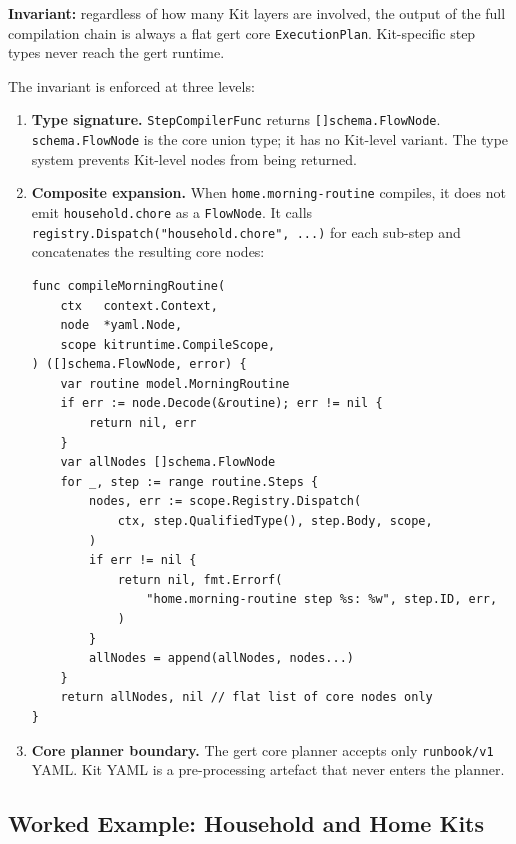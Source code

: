 \textbf{Invariant:} regardless of how many Kit layers are involved, the output
of the full compilation chain is always a flat gert core
\texttt{ExecutionPlan}.  Kit-specific step types never reach the gert runtime.

The invariant is enforced at three levels:

\begin{enumerate}
  \item \textbf{Type signature.}  \texttt{StepCompilerFunc} returns
    \texttt{[]schema.FlowNode}.  \texttt{schema.FlowNode} is the core union
    type; it has no Kit-level variant.  The type system prevents Kit-level
    nodes from being returned.

  \item \textbf{Composite expansion.}  When \texttt{home.morning-routine}
    compiles, it does not emit \texttt{household.chore} as a
    \texttt{FlowNode}.  It calls
    \texttt{registry.Dispatch("household.chore",~...)} for each sub-step and
    concatenates the resulting core nodes:

\begin{verbatim}
func compileMorningRoutine(
    ctx   context.Context,
    node  *yaml.Node,
    scope kitruntime.CompileScope,
) ([]schema.FlowNode, error) {
    var routine model.MorningRoutine
    if err := node.Decode(&routine); err != nil {
        return nil, err
    }
    var allNodes []schema.FlowNode
    for _, step := range routine.Steps {
        nodes, err := scope.Registry.Dispatch(
            ctx, step.QualifiedType(), step.Body, scope,
        )
        if err != nil {
            return nil, fmt.Errorf(
                "home.morning-routine step %s: %w", step.ID, err,
            )
        }
        allNodes = append(allNodes, nodes...)
    }
    return allNodes, nil // flat list of core nodes only
}
\end{verbatim}

  \item \textbf{Core planner boundary.}  The gert core planner accepts only
    \texttt{runbook/v1} YAML.  Kit YAML is a pre-processing artefact that
    never enters the planner.
\end{enumerate}

\subsection{Worked Example: Household and Home Kits}
\label{subsec:kit-worked-example}

